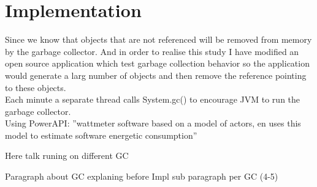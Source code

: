 \section{Implementation}
\label{sec:Implementation}
Since we know that objects that are not referenced will be removed from memory by the garbage collector.
And in order to realise this study I have modified an open source application\cite{GCTest} which test garbage collection behavior so the application would generate a larg number of objects and then remove the reference pointing to these objects.\\
Each minute a separate thread calls System.gc() to encourage JVM to run the garbage collector.\\
Using PowerAPI\cite{powerAPI}: ''wattmeter software based on a model of actors, en uses this model to estimate software energetic consumption''\cite{powerAPIFR}
 
 
 Here talk runing on different GC
 
 Paragraph about GC explaning before Impl
 sub paragraph per GC (4-5)